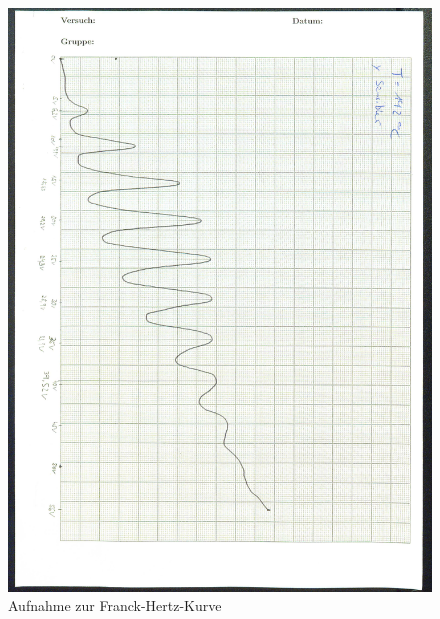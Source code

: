 \begin{figure}[p]
  \centering
  \includegraphics[width=\textwidth]{content/FHKurve.jpg}
  \caption{Aufnahme zur Franck-Hertz-Kurve}
  \label{Bild:3}
\end{figure}
